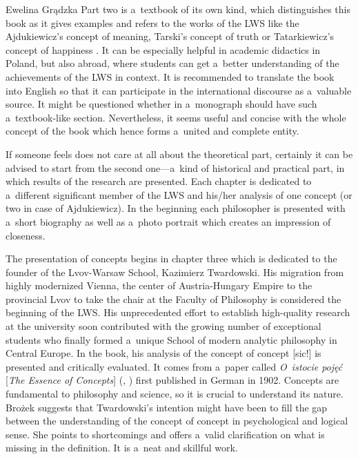 \begin{newrevengenv}{Ewelina Grądzka}
Part two is a~textbook of its own kind, which distinguishes this book as it gives examples and refers to the works of the LWS like the Ajdukiewicz's concept of meaning, Tarski's concept of truth or Tatarkiewicz's concept of happiness
\parencite[][p.52]{brozek_anti-irrationalism_2020}. %
 It can be especially helpful in academic didactics in Poland, but also abroad, where students can get a~better understanding of the achievements of the LWS in context. 
 It is recommended to translate the book into English so that it can participate in the international discourse as a~valuable source. It might be questioned whether in a~monograph should have such a~textbook-like section. Nevertheless, it seems useful and concise with the whole concept of the book which hence forms a~united and complete entity.

If someone feels 
does not care at all about
the theoretical part, certainly it can be advised to start from the second one---a~kind of historical and practical part, in which results of the research are presented. Each chapter is dedicated to a~different significant member of the LWS and his/her analysis of one concept (or two in case of Ajdukiewicz). In the beginning each philosopher is presented with a~short biography as well as a~photo portrait which creates an impression of closeness.

The presentation of concepts begins in chapter three which is dedicated to the founder of the Lvov-Warsaw School, Kazimierz Twardowski. His migration from highly modernized Vienna, the center of Austria-Hungary Empire to the provincial Lvov to take the chair at the Faculty of Philosophy is considered the beginning of the LWS. His unprecedented effort to establish high-quality research at the university soon contributed with the growing number of exceptional students who finally formed a~unique School of modern analytic philosophy in Central Europe. In the book, his analysis of the concept of concept [sic!] is presented and critically evaluated. It comes from a~paper called \textit{O~istocie pojęć} [\textit{The Essence of Concepts}]
(\cite[][]{twardowski_o_1965}, \cite*[Eng. transl.][]{brandl_essence_1999}) %
 first published in German in 1902. Concepts are fundamental to philosophy and science, so it is crucial to understand its nature. Brożek suggests that Twardowski's intention might have been to fill the gap between the understanding of the concept of concept in psychological and logical sense. She points to shortcomings and offers a~valid clarification on what is missing in the definition. It is a~neat and skillful work.


\end{newrevengenv}
